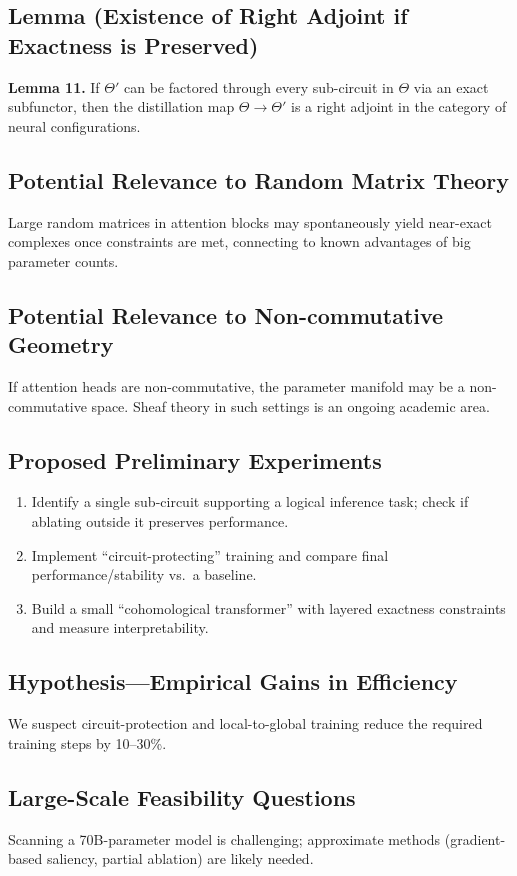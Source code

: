 \documentclass{article}
\begin{document}
\subsection{Lemma (Existence of Right Adjoint if Exactness is Preserved)}
\textbf{Lemma 11.}  
If $\Theta'$ can be factored through every sub-circuit in $\Theta$ via an exact subfunctor, then the distillation map $\Theta \to \Theta'$ is a right adjoint in the category of neural configurations.

\subsection{Potential Relevance to Random Matrix Theory}
Large random matrices in attention blocks may spontaneously yield near-exact complexes once constraints are met, connecting to known advantages of big parameter counts.

\subsection{Potential Relevance to Non-commutative Geometry}
If attention heads are non-commutative, the parameter manifold may be a non-commutative space. Sheaf theory in such settings is an ongoing academic area.

\subsection{Proposed Preliminary Experiments}
\begin{enumerate}
\item Identify a single sub-circuit supporting a logical inference task; check if ablating outside it preserves performance.
\item Implement “circuit-protecting” training and compare final performance/stability vs.\ a baseline.
\item Build a small “cohomological transformer” with layered exactness constraints and measure interpretability.
\end{enumerate}

\subsection{Hypothesis—Empirical Gains in Efficiency}
We suspect circuit-protection and local-to-global training reduce the required training steps by 10--30\%.

\subsection{Large-Scale Feasibility Questions}
Scanning a 70B-parameter model is challenging; approximate methods (gradient-based saliency, partial ablation) are likely needed.
\end{document}

